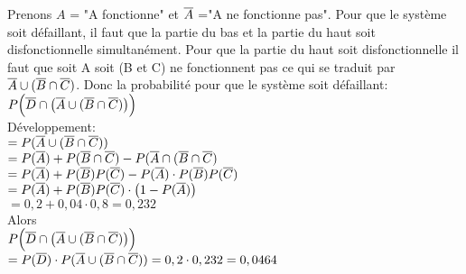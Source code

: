 \begin{exo}
  \begin{flushleft}
    Prenons $A$ = "A fonctionne" et $\overline{A}$ ="A ne fonctionne pas". Pour que le système soit défaillant, il faut que la partie du bas et la partie du haut soit disfonctionnelle simultanément. Pour que la partie du haut soit disfonctionnelle il faut que soit A soit (B et C) ne fonctionnent pas ce qui se traduit par $\overline{A} \cup (\overline{B}\cap \overline{C})$. Donc la probabilité pour que le système soit défaillant: $P\Big(\overline{D}\cap \big( \overline{A} \cup (\overline{B}\cap \overline{C})\big)\Big) $
    \\Développement:
    \\$= P(\overline{A} \cup (\overline{B} \cap \overline{C}))$
    \\$= P(\overline{A}) + P(\overline{B} \cap \overline{C}) - P(\overline{A} \cap (\overline{B} \cap \overline{C})$
    \\$= P(\overline{A}) + P(\overline{B})P(\overline{C}) -  P(\overline{A})\cdot P(\overline{B})P(\overline{C})$
    \\$= P(\overline{A}) + P(\overline{B})P(\overline{C}) \cdot \big(1-P(\overline{A})\big)$
    \\$= 0,2 + 0,04 \cdot 0,8 = 0,232$
    \\ Alors
    \\$P\Big(\overline{D}\cap \big( \overline{A} \cup (\overline{B}\cap \overline{C})\big)\Big) $
    \\$= P(\overline{D})\cdot P(\overline{A} \cup (\overline{B} \cap \overline{C})) = 0,2 \cdot 0,232  = 0,0464$
  \end{flushleft}
\end{exo}
